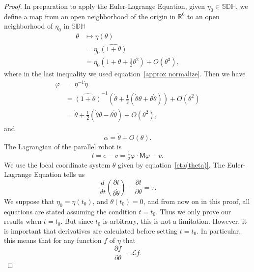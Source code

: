 \documentclass[reqno,12pt]{amsart}
\newcommand\setunitdualquat{\mathbb S\mathbb D\mathbb H}
\newcommand{\liederiv}{\mathcal L}
\begin{document}
\begin{proof}  In preparation to apply the Euler-Lagrange Equation, given $\eta_0 \in \setunitdualquat$, we define a map from an open neighborhood of the origin in $\mathbb R^6$ to an open neighborhood of $\eta_0$ in $\setunitdualquat$
\begin{equation}
\label{eta(theta)}
\begin{aligned}
\theta &\mapsto \eta(\theta) \\
&= \eta_0 \widehat{(1+\theta)} \\
&= \eta_0 (1 + \theta + \tfrac12 \theta^2) + O(\theta^3),
\end{aligned}
\end{equation}
where in the last inequality we used equation~\eqref{approx normalize}.  Then we have
\begin{equation}
\label{dot theta}
\begin{aligned}
\varphi &= \eta^{-1} \dot\eta \\
&= \widehat{(1+\theta)}^{-1} (\dot \theta + \tfrac12(\dot\theta\theta + \theta\dot\theta)) + O(\theta^2) \\
&= \dot\theta + \tfrac12(\dot\theta\theta - \theta\dot\theta) + O(\theta^2) ,
\end{aligned}
\end{equation}
and
\begin{equation}
\label{ddot theta}
\alpha = \ddot\theta + O(\theta) .
\end{equation}
The Lagrangian of the parallel robot is
\begin{equation}
l = e - v = \tfrac12 \varphi \cdot \mathsf M \varphi - v.
\end{equation}
We use the local coordinate system $\theta$ given by equation~\eqref{eta(theta)}.  The Euler-Lagrange Equation \cite{arnold,goldstein-et-al} tells us
\begin{equation}
\label{e-l}
\frac d{dt}\left(\frac{\partial l}{\partial \dot\theta}\right) - \frac{\partial l}{\partial \theta} = \tau.
\end{equation}
We suppose that $\eta_0 = \eta(t_0)$, and $\theta(t_0) = 0$, and from now on in this proof, all equations are stated assuming the condition $t = t_0$.  Thus we only prove our results when $t = t_0$.  But since $t_0$ is arbitrary, this is not a limitation.  However, it is important that derivatives are calculated before setting $t = t_0$.  In particular, this means that for any function $f$ of $\eta$ that
\begin{equation}
\frac{\partial f}{\partial \theta} = \liederiv f.
\end{equation}


\end{proof}
\end{document}
